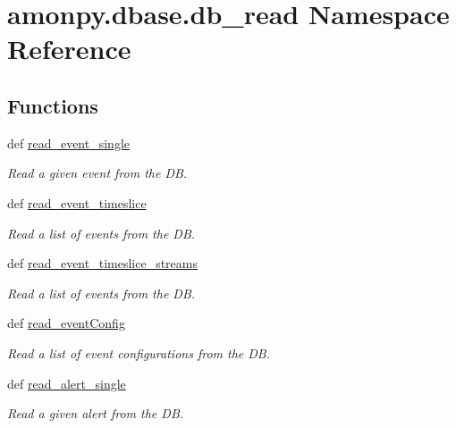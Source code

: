 \hypertarget{namespaceamonpy_1_1dbase_1_1db__read}{\section{amonpy.\-dbase.\-db\-\_\-read Namespace Reference}
\label{namespaceamonpy_1_1dbase_1_1db__read}
}
\subsection*{Functions}
\begin{DoxyCompactItemize}
\item 
def \hyperlink{namespaceamonpy_1_1dbase_1_1db__read_aadfa918c61f17617c45347f988f99d40}{read\-\_\-event\-\_\-single}
\begin{DoxyCompactList}\small\item\em Read a given event from the D\-B. \end{DoxyCompactList}\item 
def \hyperlink{namespaceamonpy_1_1dbase_1_1db__read_a87534985aa3a945c03ef031a3001b6fb}{read\-\_\-event\-\_\-timeslice}
\begin{DoxyCompactList}\small\item\em Read a list of events from the D\-B. \end{DoxyCompactList}\item 
def \hyperlink{namespaceamonpy_1_1dbase_1_1db__read_a70f32a72bc370d0c49e1c37a9dee7400}{read\-\_\-event\-\_\-timeslice\-\_\-streams}
\begin{DoxyCompactList}\small\item\em Read a list of events from the D\-B. \end{DoxyCompactList}\item 
def \hyperlink{namespaceamonpy_1_1dbase_1_1db__read_add5550ef892288fab9ad494852474746}{read\-\_\-event\-Config}
\begin{DoxyCompactList}\small\item\em Read a list of event configurations from the D\-B. \end{DoxyCompactList}\item 
def \hyperlink{namespaceamonpy_1_1dbase_1_1db__read_a827488ee2cbca3079ec2875508c9c9f5}{read\-\_\-alert\-\_\-single}
\begin{DoxyCompactList}\small\item\em Read a given alert from the D\-B. \end{DoxyCompactList}\item 

\end{DoxyCompactItemize}
